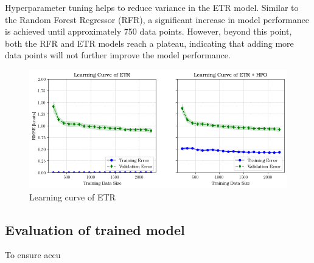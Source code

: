 Hyperparameter tuning helps to reduce variance in the ETR model. Similar to the Random Forest Regressor (RFR), a significant increase in model performance is achieved until approximately 750 data points. However, beyond this point, both the RFR and ETR models reach a plateau, indicating that adding more data points will not further improve the model performance.

\begin{figure}[h]
    \centering
        \includegraphics[width=.95\textwidth]{02_figures/learning_curve_etr_rmse.png}
        \caption{Learning curve of ETR}
        \label{fig:learn_curve_ETR_RMSE}
\end{figure}


\subsection*{Evaluation of trained model}\label{sec:BBM_model_eval}

To ensure accu

